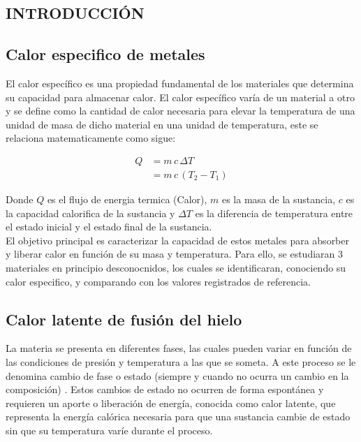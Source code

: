 \documentclass[10pt]{article}
\begin{document}
\begin{multicols*}{2}
    \section{\small INTRODUCCIÓN}
    \subsection*{\small Calor especifico de metales}
    El calor específico es una propiedad fundamental de los materiales que
    determina su capacidad para almacenar calor. El
    calor específico varía de un material a otro y se define como la cantidad de
    calor necesaria para elevar la temperatura de una unidad de masa de dicho
    material en una unidad de temperatura, este se relaciona matematicamente como sigue:

    \begin{equation}
        \begin{split}
            Q &= m \, c \, \Delta T \\
            &= m \, c \, (T_2 - T_1)
        \end{split}
        \label{eq:flujo_calor}
    \end{equation}

    Donde $Q$ es el flujo de energia termica (Calor), $m$ es la masa de la
    sustancia, $c$ es la capacidad calorifica de la sustancia y $\Delta T$ es la
    diferencia de temperatura entre el estado inicial y el estado final de la
    sustancia.\\
    El objetivo principal es caracterizar la capacidad de estos
    metales para absorber y liberar calor en función de su masa y temperatura.
    Para ello, se estudiaran 3 materiales en principio desconocnidos, los cuales se identificaran, 
    conociendo su calor especifico, y comparando con los valores registrados de referencia.

    \subsection*{\small Calor latente de fusión del hielo}
    La materia se presenta en diferentes fases, las cuales pueden variar en función
    de las condiciones de presión y temperatura a las que se someta. A este proceso
    se le denomina cambio de fase o estado (siempre y cuando no ocurra un cambio en
    la composición) \cite{calorLatente}. Estos cambios de estado no ocurren de
    forma espontánea y requieren un aporte o liberación de energía, conocida como
    calor latente, que representa la energía calórica necesaria para que una
    sustancia cambie de estado sin que su temperatura varíe durante el proceso.


\end{multicols*}
\end{document}
